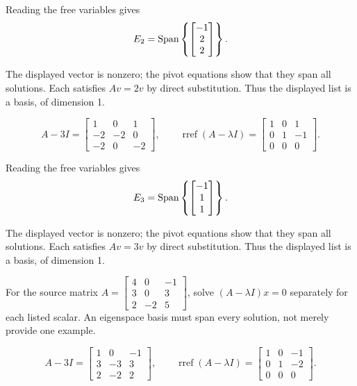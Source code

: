 Reading the free variables gives
\[ E_{2}=\operatorname{Span}\left\{\begin{bmatrix}-1\\2\\2\end{bmatrix}\right\}.\]

The displayed vector is nonzero; the pivot equations show that they span all solutions. Each satisfies $Av=2v$ by direct substitution. Thus the displayed list is a basis, of dimension 1.

\[ A-3I=\begin{bmatrix}1 & 0 & 1\\-2 & -2 & 0\\-2 & 0 & -2\end{bmatrix},\qquad\operatorname{rref}(A-\lambda I)=\begin{bmatrix}1 & 0 & 1\\0 & 1 & -1\\0 & 0 & 0\end{bmatrix}.\]

Reading the free variables gives
\[ E_{3}=\operatorname{Span}\left\{\begin{bmatrix}-1\\1\\1\end{bmatrix}\right\}.\]

The displayed vector is nonzero; the pivot equations show that they span all solutions. Each satisfies $Av=3v$ by direct substitution. Thus the displayed list is a basis, of dimension 1.

For the source matrix $A=\begin{bmatrix}4 & 0 & -1\\3 & 0 & 3\\2 & -2 & 5\end{bmatrix}$, solve $(A-\lambda I)x=0$ separately for each listed scalar. An eigenspace basis must span every solution, not merely provide one example.

\[ A-3I=\begin{bmatrix}1 & 0 & -1\\3 & -3 & 3\\2 & -2 & 2\end{bmatrix},\qquad\operatorname{rref}(A-\lambda I)=\begin{bmatrix}1 & 0 & -1\\0 & 1 & -2\\0 & 0 & 0\end{bmatrix}.\]

